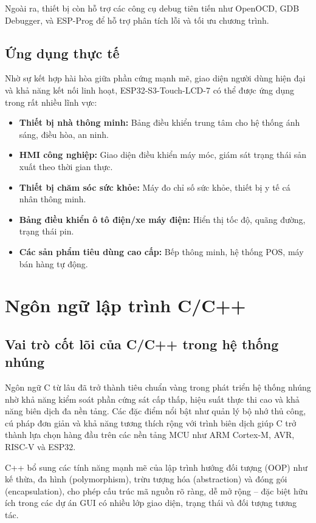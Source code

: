 \tab Ngoài ra, thiết bị còn hỗ trợ các công cụ debug tiên tiến như OpenOCD, GDB Debugger, và ESP-Prog để hỗ trợ phân tích lỗi và tối ưu chương trình.

\subsection{Ứng dụng thực tế}
\tab Nhờ sự kết hợp hài hòa giữa phần cứng mạnh mẽ, giao diện người dùng hiện đại và khả năng kết nối linh hoạt, ESP32-S3-Touch-LCD-7 có thể được ứng dụng trong rất nhiều lĩnh vực:

\begin{itemize} 
  \item \textbf{Thiết bị nhà thông minh:} Bảng điều khiển trung tâm cho hệ thống ánh sáng, điều hòa, an ninh. 
  \item \textbf{HMI công nghiệp:} Giao diện điều khiển máy móc, giám sát trạng thái sản xuất theo thời gian thực. 
  \item \textbf{Thiết bị chăm sóc sức khỏe:} Máy đo chỉ số sức khỏe, thiết bị y tế cá nhân thông minh. 
  \item \textbf{Bảng điều khiển ô tô điện/xe máy điện:} Hiển thị tốc độ, quãng đường, trạng thái pin. 
  \item \textbf{Các sản phẩm tiêu dùng cao cấp:} Bếp thông minh, hệ thống POS, máy bán hàng tự động. 
\end{itemize}
\section{Ngôn ngữ lập trình C/C++}

\subsection{Vai trò cốt lõi của C/C++ trong hệ thống nhúng}
Ngôn ngữ C từ lâu đã trở thành tiêu chuẩn vàng trong phát triển hệ thống nhúng nhờ khả năng kiểm soát phần cứng sát cấp thấp, hiệu suất thực thi cao và khả năng biên dịch đa nền tảng. Các đặc điểm nổi bật như quản lý bộ nhớ thủ công, cú pháp đơn giản và khả năng tương thích rộng với trình biên dịch giúp C trở thành lựa chọn hàng đầu trên các nền tảng MCU như ARM Cortex-M, AVR, RISC-V và ESP32.

C++ bổ sung các tính năng mạnh mẽ của lập trình hướng đối tượng (OOP) như kế thừa, đa hình (polymorphism), trừu tượng hóa (abstraction) và đóng gói (encapsulation), cho phép cấu trúc mã nguồn rõ ràng, dễ mở rộng – đặc biệt hữu ích trong các dự án GUI có nhiều lớp giao diện, trạng thái và đối tượng tương tác.


